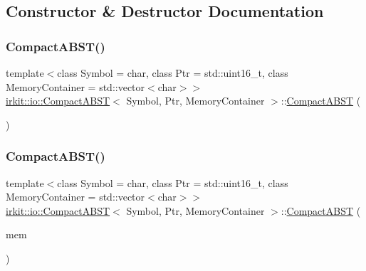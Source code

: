 \subsection{Constructor \& Destructor Documentation}
\mbox{\label{classirkit_1_1io_1_1CompactABST_a1798488f66866fcf6f4d7fd06f86f3e1}} 
\subsubsection{\texorpdfstring{Compact\+A\+B\+S\+T()}{CompactABST()}\hspace{0.1cm}{\footnotesize\ttfamily [1/2]}}
{\footnotesize\ttfamily template$<$class Symbol = char, class Ptr = std\+::uint16\+\_\+t, class Memory\+Container = std\+::vector$<$char$>$$>$ \\
\mbox{\hyperlink{classirkit_1_1io_1_1CompactABST}{irkit\+::io\+::\+Compact\+A\+B\+ST}}$<$ Symbol, Ptr, Memory\+Container $>$\+::\mbox{\hyperlink{classirkit_1_1io_1_1CompactABST}{Compact\+A\+B\+ST}} (\begin{DoxyParamCaption}{ }\end{DoxyParamCaption})\hspace{0.3cm}{\ttfamily [default]}}

\mbox{\label{classirkit_1_1io_1_1CompactABST_ae247cd36f3a912208312a6fd20a9deda}} 
\subsubsection{\texorpdfstring{Compact\+A\+B\+S\+T()}{CompactABST()}\hspace{0.1cm}{\footnotesize\ttfamily [2/2]}}
{\footnotesize\ttfamily template$<$class Symbol = char, class Ptr = std\+::uint16\+\_\+t, class Memory\+Container = std\+::vector$<$char$>$$>$ \\
\mbox{\hyperlink{classirkit_1_1io_1_1CompactABST}{irkit\+::io\+::\+Compact\+A\+B\+ST}}$<$ Symbol, Ptr, Memory\+Container $>$\+::\mbox{\hyperlink{classirkit_1_1io_1_1CompactABST}{Compact\+A\+B\+ST}} (\begin{DoxyParamCaption}\item[{Memory\+Container}]{mem }\end{DoxyParamCaption})\hspace{0.3cm}{\ttfamily [inline]}}



